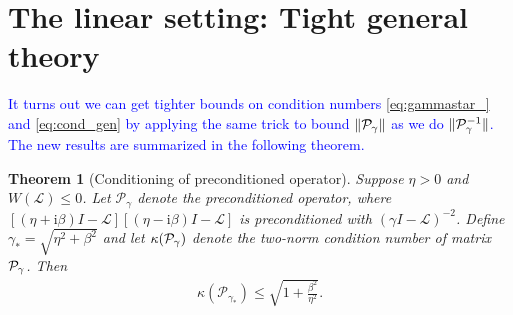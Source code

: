 \documentclass[a4paper,10pt]{article}
\newtheorem{theorem}{Theorem}
\newcommand{\tcb}{\textcolor{blue}}
\begin{document}
\section{The linear setting: Tight general theory}
\tcb{
It turns out we can get tighter bounds on condition numbers \eqref{eq:gammastar_} and \eqref{eq:cond_gen} by applying the same trick to bound $\Vert {\cal P}_{\gamma} \Vert$ as we do $\Vert {\cal P}_{\gamma}^{-1} \Vert$. The new results are summarized in the following theorem.
}

\begin{theorem}[Conditioning of preconditioned operator]\label{th:cond_lin}
\label{th:conditioning_lin}
Suppose $\eta > 0$ and $W(\mathcal{L}) \leq 0$. Let $\mathcal{P}_\gamma$ denote
the preconditioned operator, where $[(\eta + \mathrm{i}\beta)I -
\mathcal{L}][(\eta - \mathrm{i}\beta)I - \mathcal{L}]$ is
preconditioned with $(\gamma I - \mathcal{L})^{-2}$.
Define $\gamma_* = \sqrt{\eta^2+\beta^2}$ and let $\kappa({\cal P}_{\gamma})$ denote the two-norm condition number of matrix ${\cal P}_{\gamma}$. Then
%
\begin{align} \label{eq:cond_P_gamma*_bnd}
\kappa(\mathcal{P}_{\gamma_*}) \leq \sqrt{1+\frac{\beta^2}{\eta^2}}.
\end{align}
\end{theorem}
\end{document}
